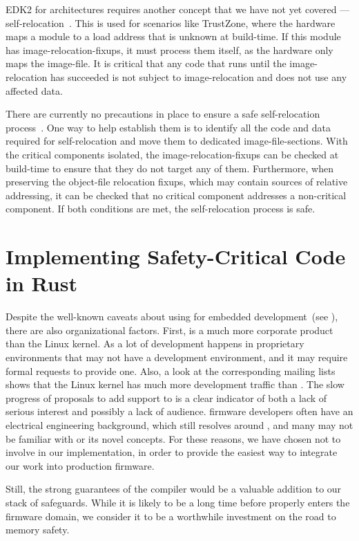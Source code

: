 \Gls{EDK2} for  architectures requires another concept that we have not yet covered --- self-relocation~\cite{edk2}. This is used for scenarios like TrustZone, where the hardware maps a module to a load address that is unknown at build-time. If this module has \glspl{image-relocation-fixup}, it must process them itself, as the hardware only maps the \gls{image-file}. It is critical that any code that runs until the \gls{image-relocation} has succeeded is not subject to \gls{image-relocation} and does not use any affected data.

There are currently no precautions in place to ensure a safe self-relocation process~\cite{edk2}. One way to help establish them is to identify all the code and data required for self-relocation and move them to dedicated \glspl{image-file-section}. With the critical components isolated, the \glspl{image-relocation-fixup} can be checked at build-time to ensure that they do not target any of them. Furthermore, when preserving the \gls{object-file} relocation fixups, which may contain sources of relative addressing, it can be checked that no critical component addresses a non-critical component. If both conditions are met, the self-relocation process is safe.

\section{Implementing Safety-Critical Code in Rust}

Despite the well-known caveats about using  for embedded development~(see ), there are also organizational factors. First,  is a much more corporate product than the Linux kernel. As a lot of development happens in proprietary environments that may not have a  development environment, and it may require formal requests to provide one. Also, a look at the corresponding mailing lists shows that the Linux kernel has much more development traffic than . The slow progress of proposals to add  support to  is a clear indicator of both a lack of serious interest and possibly a lack of audience. \Gls{firmware} developers often have an electrical engineering background, which still resolves around , and many may not be familiar with  or its novel concepts. For these reasons, we have chosen not to involve  in our implementation, in order to provide the easiest way to integrate our work into production \gls{firmware}.

Still, the strong guarantees of the  compiler would be a valuable addition to our stack of safeguards. While it is likely to be a long time before  properly enters the \gls{firmware} domain, we consider it to be a worthwhile investment on the road to memory safety.
